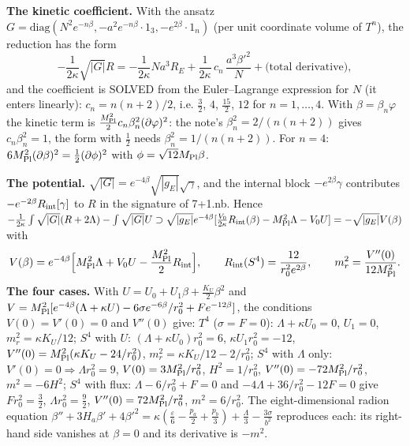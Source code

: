 \documentclass[10pt,a4paper]{article}
\begin{document}
\textbf{The kinetic coefficient.} With the ansatz $G=\mathrm{diag}(N^2e^{-n\beta},-a^2e^{-n\beta}\cdot1_3,-e^{2\beta}\cdot1_n)$ (per unit coordinate volume of $T^n$), the reduction has the form
\begin{equation*}
-\frac1{2\kappa}\sqrt{|G|}R=-\frac1{2\kappa}Na^3R_E+\frac1{2\kappa}\,c_n\,\frac{a^3\beta'^2}N+\text{(total derivative)},
\end{equation*}
and the coefficient is SOLVED from the Euler–Lagrange expression for $N$ (it enters linearly): $c_n=n(n+2)/2$, i.e. $\frac32$, $4$, $\frac{15}2$, $12$ for $n=1,\dots,4$. With $\beta=\beta_n\varphi$ the kinetic term is $\frac{M_{\rm Pl}^2}2c_n\beta_n^2(\partial\varphi)^2$: the note’s $\beta_n^2=2/(n(n+2))$ gives $c_n\beta_n^2=1$, the form with $\frac12$ needs $\beta_n^2=1/(n(n+2))$. For $n=4$: $6M_{\rm Pl}^2(\partial\beta)^2=\frac12(\partial\phi)^2$ with $\phi=\sqrt{12}M_{\rm Pl}\beta$.

\textbf{The potential.} $\sqrt{|G|}=e^{-4\beta}\sqrt{|g_E|}\sqrt\gamma$, and the internal block $-e^{2\beta}\gamma$ contributes $-e^{-2\beta}R_{\rm int}[\gamma]$ to $R$ in the signature of 7+1.nb. Hence $-\frac1{2\kappa}\int\sqrt{|G|}(R+2\Lambda)-\int\sqrt{|G|}U\supset\sqrt{|g_E|}e^{-4\beta}[\frac{V_0}{2\kappa}R_{\rm int}(\beta)-M_{\rm Pl}^2\Lambda-V_0U]=-\sqrt{|g_E|}V(\beta)$ with
\begin{equation*}
V(\beta)=e^{-4\beta}\Big[M_{\rm Pl}^2\Lambda+V_0U-\frac{M_{\rm Pl}^2}2R_{\rm int}\Big],\qquad R_{\rm int}(S^4)=\frac{12}{r_0^2e^{2\beta}},\qquad m_r^2=\frac{V''(0)}{12M_{\rm Pl}^2}.
\end{equation*}
\textbf{The four cases.} With $U=U_0+U_1\beta+\frac{K_U}2\beta^2$ and $V=M_{\rm Pl}^2[e^{-4\beta}(\Lambda+\kappa U)-6\sigma e^{-6\beta}/r_0^2+Fe^{-12\beta}]$, the conditions $V(0)=V'(0)=0$ and $V''(0)$ give: $T^4$ ($\sigma=F=0$): $\Lambda+\kappa U_0=0$, $U_1=0$, $m_r^2=\kappa K_U/12$; $S^4$ with $U$: $(\Lambda+\kappa U_0)r_0^2=6$, $\kappa U_1r_0^2=-12$, $V''(0)=M_{\rm Pl}^2(\kappa K_U-24/r_0^2)$, $m_r^2=\kappa K_U/12-2/r_0^2$; $S^4$ with $\Lambda$ only: $V'(0)=0\Rightarrow\Lambda r_0^2=9$, $V(0)=3M_{\rm Pl}^2/r_0^2$, $H^2=1/r_0^2$, $V''(0)=-72M_{\rm Pl}^2/r_0^2$, $m^2=-6H^2$; $S^4$ with flux: $\Lambda-6/r_0^2+F=0$ and $-4\Lambda+36/r_0^2-12F=0$ give $Fr_0^2=\frac32$, $\Lambda r_0^2=\frac92$, $V''(0)=72M_{\rm Pl}^2/r_0^2$, $m^2=6/r_0^2$. The eight-dimensional radion equation $\beta''+3H_a\beta'+4\beta'^2=\kappa(\frac\varepsilon6-\frac{p_a}2+\frac{p_b}3)+\frac\Lambda3-\frac{3\sigma}{b^2}$ reproduces each: its right-hand side vanishes at $\beta=0$ and its derivative is $-m^2$.
\end{document}
